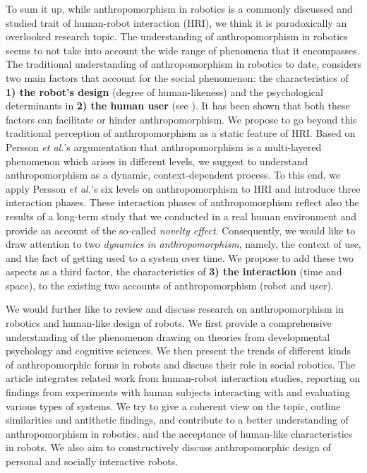 \documentclass[twocolumn]{svjour3}          %
\begin{document}
	To sum it up, while anthropomorphism in robotics is a commonly discussed and studied trait of human-robot interaction (HRI), we think it is paradoxically an overlooked research topic. The understanding of anthropomorphism in robotics seems to not take into account the wide range of phenomena that it encompasses. The traditional understanding of anthropomorphism in robotics to date, considers two main factors that account for the social phenomenon: the characteristics of \textbf{1) the robot's design} (degree of human-likeness) and the psychological determinants in \textbf{2) the human user} (see \cite{epley_seeing_2007}). It has been shown that both these factors can facilitate or hinder anthropomorphism. We propose to go beyond this traditional perception of anthropomorphism as a static feature of HRI. Based on Persson \textit{et al.}'s \cite{persson_anthropomorphism_2000} argumentation that anthropomorphism is a multi-layered phenomenon which arises in different levels, we suggest to understand anthropomorphism as a dynamic, context-dependent process. To this end, we apply Persson \textit{et al.}'s six levels on anthropomorphism to HRI and introduce three interaction phases. These interaction phases of anthropomorphism reflect also the results of a long-term study that we conducted in a real human environment and provide an account of the so-called \textit{novelty effect}. Consequently, we would like to draw attention to two \textit{dynamics in anthropomorphism}, namely, the context of use, and the fact of getting used to a system over time. We propose to add these two aspects as a third factor, the characteristics of \textbf{3) the interaction} (time and space), to the existing two accounts of anthropomorphism (robot and user). 
					
	We would further like to review and discuss research on anthropomorphism in robotics and human-like design of robots. We first provide a comprehensive understanding of the phenomenon drawing on theories from developmental psychology and cognitive sciences. We then present the trends of different kinds of anthropomorphic forms in robots and discuss their role in social robotics. The article integrates related work from human-robot interaction studies, reporting on findings from experiments with human subjects interacting with and evaluating various types of systems. We try to give a coherent view on the topic, outline similarities and antithetic findings, and contribute to a better understanding of anthropomorphism in robotics, and the acceptance of human-like characteristics in robots. We also aim to constructively discuss anthropomorphic design of personal and socially interactive robots. 
	
\end{document}
